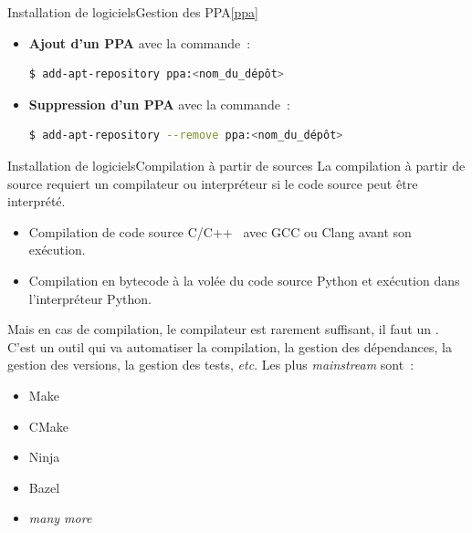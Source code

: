 \documentclass{beamer}
\begin{document}
    \begin{frame}[fragile]{Installation de logiciels}{Gestion des PPA\cref{ppa}}
        \begin{itemize}
            \item \textbf{Ajout d'un PPA} avec la commande~:
            \begin{lstlisting}[language=bash]
$ add-apt-repository ppa:<nom_du_dépôt>
            \end{lstlisting}
            \item \textbf{Suppression d'un PPA} avec la commande~:
            \begin{lstlisting}[language=bash]
$ add-apt-repository --remove ppa:<nom_du_dépôt>
            \end{lstlisting}
        \end{itemize}
    \end{frame}

    \begin{frame}{Installation de logiciels}{Compilation à partir de sources}
        La compilation à partir de source requiert un compilateur ou interpréteur si le code source peut être interprété.
        \bigbreak
        \begin{itemize}
            \item Compilation de code source C/C++~ avec GCC ou Clang avant son exécution.
            \item Compilation en bytecode à la volée du code source Python et exécution dans l'interpréteur Python.
        \end{itemize}
        Mais en cas de compilation, le compilateur est rarement suffisant, il faut un .
        C'est un outil qui va automatiser la compilation, la gestion des dépendances, la gestion des versions, la gestion des tests, \textit{etc}.
        Les plus \textit{mainstream} sont~:
        \begin{itemize}
            \item Make
            \item CMake
            \item Ninja
            \item Bazel
            \item \textit{many more}
        \end{itemize}
    \end{frame}
\end{document}
